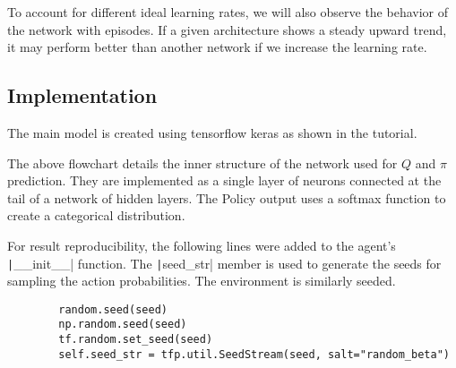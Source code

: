 \documentclass[A4]{article}
\begin{document}
    To account for different ideal learning rates, we will also observe the behavior of the network with episodes.
    If a given architecture shows a steady upward trend, it may perform better than another network if we increase the learning rate.

    \subsection{Implementation}\label{subsec:implementation}

    The main model is created using tensorflow keras as shown in the tutorial.

    \begin{center}
    \end{center}

    The above flowchart details the inner structure of the network used for $Q$ and $\pi$ prediction.
    They are implemented as a single layer of neurons connected at the tail of a network of hidden layers.
    The Policy output uses a softmax function to create a categorical distribution.


    For result reproducibility, the following lines were added to the agent's \texttt|__init__| function.
    The \texttt|seed_str| member is used to generate the seeds for sampling the action probabilities.
    The environment is similarly seeded.
    \begin{verbatim}
        random.seed(seed)
        np.random.seed(seed)
        tf.random.set_seed(seed)
        self.seed_str = tfp.util.SeedStream(seed, salt="random_beta")
    \end{verbatim}
\end{document}

